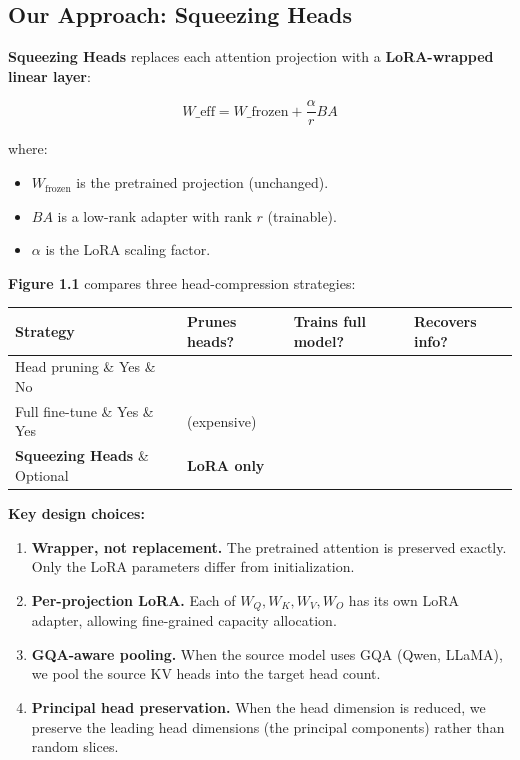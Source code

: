 \subsection{Our Approach: Squeezing Heads}

\textbf{Squeezing Heads} replaces each attention projection with a 
\textbf{LoRA-wrapped linear layer}:

\[
W\_\text{eff} = W\_\text{frozen} + \frac{\alpha}{r} B A
\]

where:
\begin{itemize}
\item $W_\text{frozen}$ is the pretrained projection (unchanged).
\item $B A$ is a low-rank adapter with rank $r$ (trainable).
\item $\alpha$ is the LoRA scaling factor.

\end{itemize}
\textbf{Figure 1.1} compares three head-compression strategies:

\begin{table}[H]
\centering
\small
\begin{tabular}{llll}
\toprule
\textbf{Strategy} & \textbf{Prunes heads?} & \textbf{Trains full model?} & \textbf{Recovers info?} \\
\midrule
Head pruning \& Yes \& No &  \\
Full fine-tune \& Yes \& Yes & (expensive) \\
\textbf{Squeezing Heads} \& Optional & \textbf{LoRA only} &  \\
\bottomrule
\end{tabular}
\end{table}

\textbf{Key design choices:}

\begin{enumerate}
\item \textbf{Wrapper, not replacement.} The pretrained attention is preserved
  exactly. Only the LoRA parameters differ from initialization.
\item \textbf{Per-projection LoRA.} Each of $W_Q, W_K, W_V, W_O$ has its own LoRA
  adapter, allowing fine-grained capacity allocation.
\item \textbf{GQA-aware pooling.} When the source model uses GQA (Qwen, LLaMA),
  we pool the source KV heads into the target head count.
\item \textbf{Principal head preservation.} When the head dimension is reduced, we
  preserve the leading head dimensions (the principal components) rather
  than random slices.

\end{enumerate}
